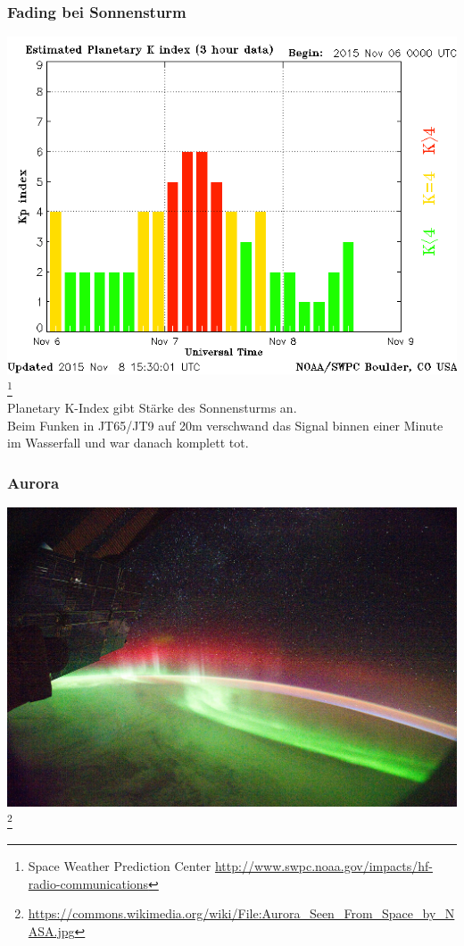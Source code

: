 \begin{frame}
  \frametitle{Fading bei Sonnensturm}
  \begin{center}
    \includegraphics[width=.8\textwidth,height=.6\textheight,keepaspectratio]{e09/planetary-k-index.png}
    \footnote{\tiny Space Weather Prediction Center \url{http://www.swpc.noaa.gov/impacts/hf-radio-communications}}\\
    Planetary K-Index gibt Stärke des Sonnensturms an.\\
    Beim Funken in JT65/JT9 auf 20m verschwand das Signal binnen einer Minute im Wasserfall und war danach komplett tot.
  \end{center}
\end{frame}

\begin{frame}
    \frametitle{Aurora}
	\begin{center}
        \includegraphics[width=.9\textwidth,height=.8\textheight,keepaspectratio]{e09/Aurora_Seen_From_Space_by_NASA.jpg}
        \footnote{\tiny \url{https://commons.wikimedia.org/wiki/File:Aurora_Seen_From_Space_by_NASA.jpg}}
    \end{center}
\end{frame}

